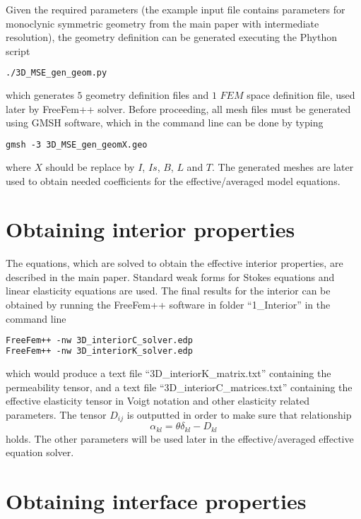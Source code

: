 \documentclass[12pt,a4paper]{article}
\begin{document}
Given the required parameters (the example input file contains parameters for monoclynic symmetric geometry from the main paper with intermediate resolution), the geometry definition can be generated executing the Phython script
\begin{lstlisting}[language=tex]
./3D_MSE_gen_geom.py
\end{lstlisting}
which generates $5$ geometry definition files and $1$ $FEM$ space definition file, used later by FreeFem++ solver. Before proceeding, all mesh files must be generated using GMSH software, which in the command line can be done by typing
\begin{lstlisting}[language=tex]
gmsh -3 3D_MSE_gen_geomX.geo
\end{lstlisting}
where $X$ should be replace by $I$, $Is$, $B$, $L$ and $T$. The generated meshes are later used to obtain needed coefficients for the effective/averaged model equations.

\section{Obtaining interior properties}

The equations, which are solved to obtain the effective interior properties, are described in the main paper. Standard weak forms for Stokes equations and linear elasticity equations are used. The final results for the interior can be obtained by running the FreeFem++ software in folder ``1\_Interior'' in the command line
\begin{lstlisting}[language=tex]
FreeFem++ -nw 3D_interiorC_solver.edp
FreeFem++ -nw 3D_interiorK_solver.edp
\end{lstlisting}
which would produce a text file ``3D\_interiorK\_matrix.txt'' containing the permeability tensor, and a text file ``3D\_interiorC\_matrices.txt'' containing the effective elasticity tensor in Voigt notation and other elasticity related parameters. The tensor $D_{ij}$ is outputted in order to make sure that relationship
\begin{equation}
\alpha_{kl} = \theta \delta_{kl} - D_{kl} \nonumber
\end{equation}
holds. The other parameters will be used later in the effective/averaged effective equation solver.

\section{Obtaining interface properties} \label{sec:presim-end}
\end{document}
